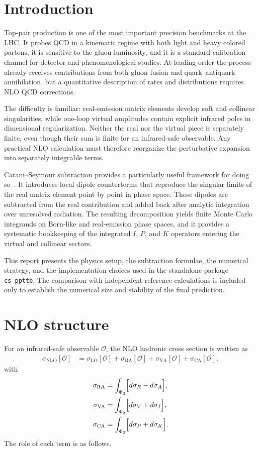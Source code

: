 \documentclass[11pt]{article}
\begin{document}
\section{Introduction}
Top-pair production is one of the most important precision benchmarks at the LHC.
It probes QCD in a kinematic regime with both light and heavy colored partons, it is sensitive to the gluon luminosity,
and it is a standard calibration channel for detector and phenomenological studies.
At leading order the process already receives contributions from both gluon fusion and quark--antiquark annihilation,
but a quantitative description of rates and distributions requires NLO QCD corrections.

The difficulty is familiar: real-emission matrix elements develop soft and collinear singularities,
while one-loop virtual amplitudes contain explicit infrared poles in dimensional regularization.
Neither the real nor the virtual piece is separately finite, even though their sum is finite for an infrared-safe observable.
Any practical NLO calculation must therefore reorganize the perturbative expansion into separately integrable terms.

Catani--Seymour subtraction provides a particularly useful framework for doing so~\cite{Catani:1996vz}.
It introduces local dipole counterterms that reproduce the singular limits of the real matrix element point by point in phase space.
Those dipoles are subtracted from the real contribution and added back after analytic integration over unresolved radiation.
The resulting decomposition yields finite Monte Carlo integrands on Born-like and real-emission phase spaces,
and it provides a systematic bookkeeping of the integrated $I$, $P$, and $K$ operators entering the virtual and collinear sectors.

This report presents the physics setup, the subtraction formulae, the numerical strategy,
and the implementation choices used in the standalone package \texttt{cs\_ppttb}.
The comparison with independent reference calculations is included only to establish the numerical size and stability of the final prediction.
\section{NLO structure}

For an infrared-safe observable $\mathcal{O}$, the NLO hadronic cross section is written as
\begin{align}
\sigma_{\text{NLO}}[\mathcal{O}] &= \sigma_{\text{LO}}[\mathcal{O}] + \sigma_{\text{RA}}[\mathcal{O}] + \sigma_{\text{VA}}[\mathcal{O}] + \sigma_{\text{CA}}[\mathcal{O}],
\end{align}
with
\begin{align}
\sigma_{\text{RA}} &= \int_{\Phi_3} \Bigl[ d\sigma_R - d\sigma_A \Bigr], \\
\sigma_{\text{VA}} &= \int_{\Phi_2} \Bigl[ d\sigma_V + d\sigma_I \Bigr], \\
\sigma_{\text{CA}} &= \int_{\Phi_2} \Bigl[ d\sigma_P + d\sigma_K \Bigr].
\end{align}
The role of each term is as follows.
\end{document}
